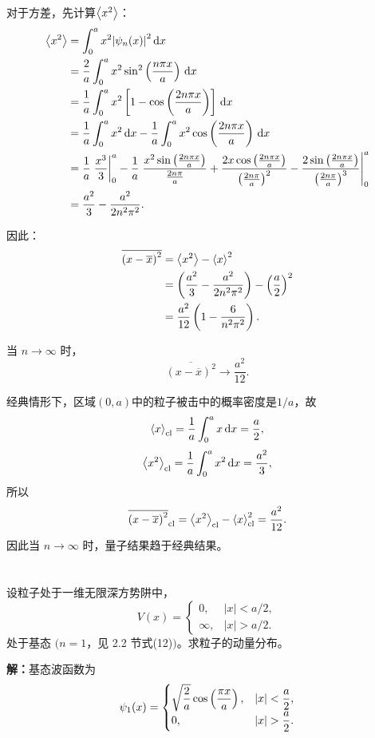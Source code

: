 \documentclass[12pt,a4paper]{article}
\begin{document}
对于方差，先计算$\ev{x^2}$：
\begin{align*}
\ev{x^2}
&=\int_0^a x^2\abs{\psi_n(x)}^2\,\dd x \\
&=\frac{2}{a}\int_0^a x^2\sin^2\left(\frac{n\pi x}{a}\right)\,\dd x \\
&=\frac{1}{a}\int_0^a x^2\left[1-\cos\left(\frac{2n\pi x}{a}\right)\right]\,\dd x \\
&=\frac{1}{a}\int_0^a x^2\,\dd x-\frac{1}{a}\int_0^a x^2\cos\left(\frac{2n\pi x}{a}\right)\,\dd x \\
&=\frac{1}{a}\eval{\frac{x^3}{3}}_0^a
-\frac{1}{a}\eval{\frac{x^2\sin\left(\frac{2n\pi x}{a}\right)}{\frac{2n\pi}{a}}
+\frac{2x\cos\left(\frac{2n\pi x}{a}\right)}{\left(\frac{2n\pi}{a}\right)^2}
-\frac{2\sin\left(\frac{2n\pi x}{a}\right)}{\left(\frac{2n\pi}{a}\right)^3}}_0^a \\
&=\frac{a^2}{3}-\frac{a^2}{2n^2\pi^2}.
\end{align*}

因此：
\begin{align*}
\overline{\left(x-\overline{x}\right)^2}
&=\ev{x^2}-\ev{x}^2 \\
&=\left(\frac{a^2}{3}-\frac{a^2}{2n^2\pi^2}\right)-\left(\frac{a}{2}\right)^2 \\
&=\frac{a^2}{12}\left(1-\frac{6}{n^2\pi^2}\right).
\end{align*}

当 $n\to\infty$ 时，
\[
\overline{\left(x-\overline{x}\right)^2}\to\frac{a^2}{12}.
\]

经典情形下，区域$(0,a)$中的粒子被击中的概率密度是$1/a$，故
\[
\ev{x}_{\mathrm{cl}}
=\frac{1}{a}\int_0^a x\,\dd x
=\frac{a}{2},
\]
\[
\ev{x^2}_{\mathrm{cl}}
=\frac{1}{a}\int_0^a x^2\,\dd x
=\frac{a^2}{3},
\]
所以
\[
\overline{\left(x-\overline{x}\right)^2}_{\mathrm{cl}}
=\ev{x^2}_{\mathrm{cl}}-\ev{x}_{\mathrm{cl}}^2
=\frac{a^2}{12}.
\]
因此当 $n\to\infty$ 时，量子结果趋于经典结果。

\section{}
设粒子处于一维无限深方势阱中，
\[
V(x)=
\begin{cases}
0, & |x|<a/2,\\
\infty, & |x|>a/2.
\end{cases}
\]
处于基态 $(n=1$，见 2.2 节式(12)$)$。求粒子的动量分布。

\vspace{0.5cm}

\noindent\textbf{解：}基态波函数为
\[
\psi_1(x)=
\begin{cases}
\sqrt{\dfrac{2}{a}}\cos\left(\dfrac{\pi x}{a}\right), & \abs{x}<\dfrac{a}{2},\\
0, & \abs{x}>\dfrac{a}{2}.
\end{cases}
\]
\end{document}

